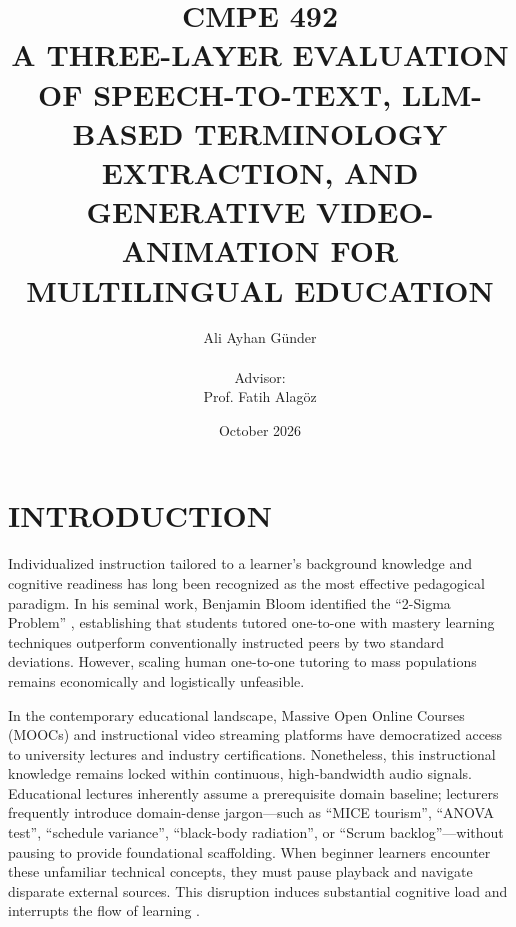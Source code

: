 \documentclass[a4paper,12pt]{report}
\begin{document}
\title{CMPE 492 \\ A THREE-LAYER EVALUATION OF SPEECH-TO-TEXT, LLM-BASED TERMINOLOGY EXTRACTION, AND GENERATIVE VIDEO-ANIMATION FOR MULTILINGUAL EDUCATION}
\author{
Ali Ayhan G{\"{u}}nder \\ \\
Advisor: \\ 
Prof. Fatih Alag{\"{o}}z
}
\date{October 2026}
\maketitle

\tableofcontents
\newpage

\chapter{INTRODUCTION}

Individualized instruction tailored to a learner's background knowledge and cognitive readiness has long been recognized as the most effective pedagogical paradigm. In his seminal work, Benjamin Bloom identified the ``2-Sigma Problem'' \cite{bloom1984}, establishing that students tutored one-to-one with mastery learning techniques outperform conventionally instructed peers by two standard deviations. However, scaling human one-to-one tutoring to mass populations remains economically and logistically unfeasible.

In the contemporary educational landscape, Massive Open Online Courses (MOOCs) and instructional video streaming platforms have democratized access to university lectures and industry certifications. Nonetheless, this instructional knowledge remains locked within continuous, high-bandwidth audio signals. Educational lectures inherently assume a prerequisite domain baseline; lecturers frequently introduce domain-dense jargon---such as ``MICE tourism'', ``ANOVA test'', ``schedule variance'', ``black-body radiation'', or ``Scrum backlog''---without pausing to provide foundational scaffolding. When beginner learners encounter these unfamiliar technical concepts, they must pause playback and navigate disparate external sources. This disruption induces substantial cognitive load and interrupts the flow of learning \cite{conde2016,xu2024}.
\end{document}

